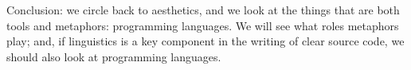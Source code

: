 
\pagebreak

Conclusion: we circle back to aesthetics, and we look at the things that are both tools and metaphors: programming languages. We will see what roles metaphors play; and, if linguistics is a key component in the writing of clear source code, we should also look at programming languages.